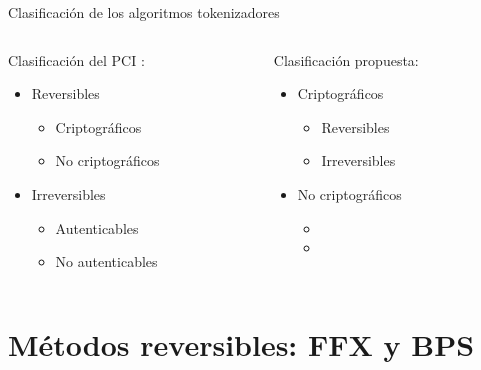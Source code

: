 \documentclass{beamer}
\begin{document}
  \begin{frame}{Clasificación de los algoritmos tokenizadores}
    \begin{center}
      \begin{columns}
        \begin{column}{0.5\textwidth}
          Clasificación del PCI \cite{pci_tokens}:
          \vspace{1.0em}
          \begin{itemize}
            \item Reversibles
            \begin{itemize}
              \item Criptográficos
              \item No criptográficos
            \end{itemize}
            \item Irreversibles
            \begin{itemize}
              \item Autenticables
              \item No autenticables
            \end{itemize}
          \end{itemize}
        \end{column}
        \begin{column}{0.5\textwidth}
          Clasificación propuesta:
          \vspace{1.0em}
          \begin{itemize}
            \item Criptográficos
            \begin{itemize}
              \item Reversibles
              \item Irreversibles
            \end{itemize}
            \item No criptográficos
            \begin{itemize}
              \item[]
              \item[]
            \end{itemize}
          \end{itemize}
        \end{column}
      \end{columns}
    \end{center}
  \end{frame}

  \section{Métodos reversibles: FFX y BPS}
\end{document}
